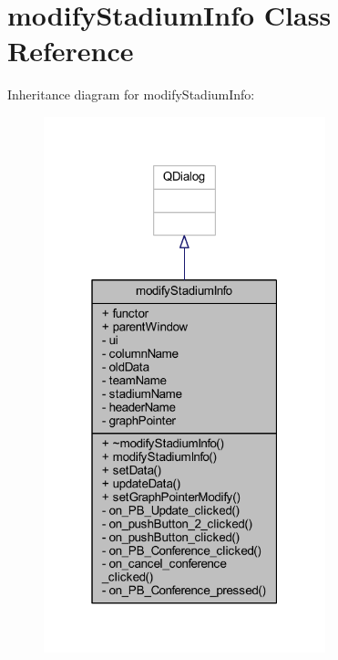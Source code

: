 \hypertarget{classmodify_stadium_info}{}\section{modify\+Stadium\+Info Class Reference}
\label{classmodify_stadium_info}


Inheritance diagram for modify\+Stadium\+Info\+:\nopagebreak
\begin{figure}[H]
\begin{center}
\leavevmode
\includegraphics[width=232pt]{classmodify_stadium_info__inherit__graph}
\end{center}
\end{figure}


